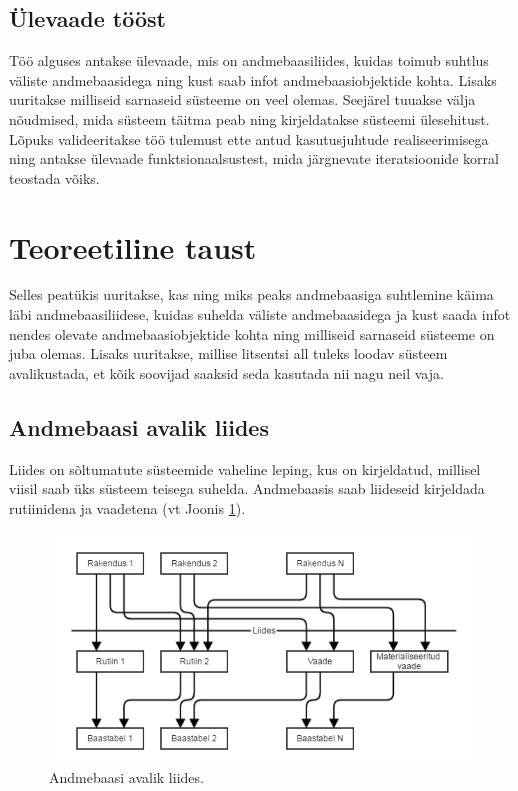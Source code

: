 \documentclass[a4paper,12pt]{article} %
\begin{document}
\subsection{Ülevaade tööst}
Töö alguses antakse ülevaade, mis on andmebaasiliides, kuidas toimub suhtlus väliste andmebaasidega ning kust saab infot andmebaasiobjektide kohta. Lisaks uuritakse milliseid sarnaseid süsteeme on veel olemas. Seejärel tuuakse välja nõudmised, mida süsteem täitma peab ning kirjeldatakse süsteemi ülesehitust. Lõpuks valideeritakse töö tulemust ette antud kasutusjuhtude realiseerimisega ning antakse ülevaade funktsionaalsustest, mida järgnevate iteratsioonide korral teostada võiks.

\section{Teoreetiline taust}
Selles peatükis uuritakse, kas ning miks peaks andmebaasiga suhtlemine käima läbi andmebaasiliidese, kuidas suhelda väliste andmebaasidega ja kust saada infot nendes olevate andmebaasiobjektide kohta ning milliseid sarnaseid süsteeme on juba olemas. Lisaks uuritakse, millise litsentsi all tuleks loodav süsteem avalikustada, et kõik soovijad saaksid seda kasutada nii nagu neil vaja.

\subsection{Andmebaasi avalik liides}
\label{andmebaasi_avalik_liides}
Liides on sõltumatute süsteemide vaheline leping, kus on kirjeldatud, millisel viisil saab üks süsteem teisega suhelda.
Andmebaasis saab liideseid kirjeldada rutiinidena ja vaadetena (vt Joonis \ref{fig_andmebaasi_avalik_liides}).

\begin{figure}[H]
\centering
\includegraphics[width=\textwidth]{./diagrams/db-interface.png}
\caption{Andmebaasi avalik liides.}
\label{fig_andmebaasi_avalik_liides}
\end{figure}
\end{document}
